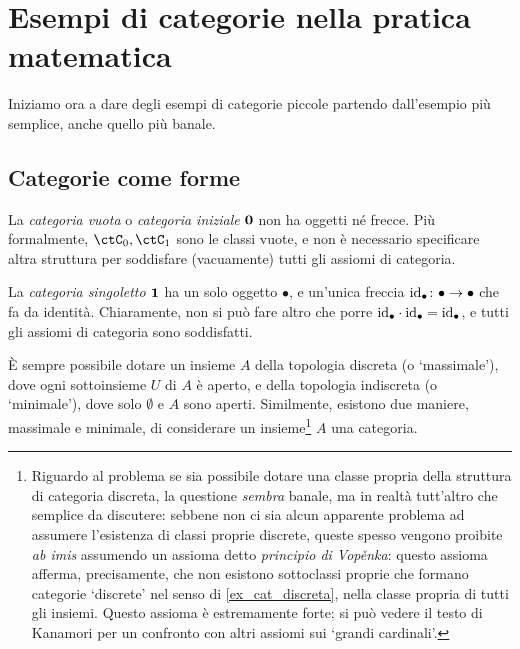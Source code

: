 \section{Esempi di categorie nella pratica matematica}\label{sec_esempi_cats}
Iniziamo ora a dare degli esempi di categorie piccole partendo dall'esempio più semplice, anche quello più banale.
\subsection{Categorie come forme}\label{ssec:categorie_forme}
\begin{example}\label{ex_cat_vuota}
 La \emph{categoria vuota} o \emph{categoria iniziale} \(\mathbf{0}\) non ha oggetti né frecce. Più formalmente, \(\ctC_0,\ctC_1\) sono le classi vuote, e non è necessario specificare altra struttura per soddisfare (vacuamente) tutti gli assiomi di categoria.
\end{example}
\begin{example}\label{ex_cat_term}
 La \emph{categoria singoletto} \(\mathbf{1}\) ha un solo oggetto \(\bullet\), e un'unica freccia \(\mathrm{id}_\bullet \colon \bullet\to\bullet\) che fa da identità. Chiaramente, non si può fare altro che porre \(\mathrm{id}_\bullet\cdot\mathrm{id}_\bullet=\mathrm{id}_\bullet\), e tutti gli assiomi di categoria sono soddisfatti.
\end{example}
È sempre possibile dotare un insieme \(A\) della topologia discreta (o `massimale'), dove ogni sottoinsieme \(U\) di \(A\) è aperto, e della topologia indiscreta (o `minimale'), dove solo \(\emptyset\) e \(A\) sono aperti. Similmente, esistono due maniere, massimale e minimale, di considerare un insieme\footnote{Riguardo al problema se sia possibile dotare una classe propria della struttura di categoria discreta, la questione \emph{sembra} banale, ma in realtà tutt'altro che semplice da discutere: sebbene non ci sia alcun apparente problema ad assumere l'esistenza di classi proprie discrete, queste spesso vengono proibite \emph{ab imis} assumendo un assioma detto \emph{principio di Vop\v enka}: questo assioma afferma, precisamente, che non esistono sottoclassi proprie che formano categorie `discrete' nel senso di \ref{ex_cat_discreta}, nella classe propria di tutti gli insiemi. Questo assioma è estremamente forte; si può vedere il testo di Kanamori \cite{Kanamori1994} per un confronto con altri assiomi sui `grandi cardinali'.} \(A\) una categoria.
